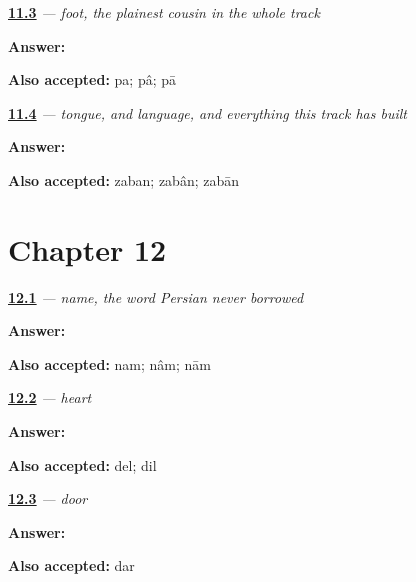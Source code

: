 \noindent\begin{minipage}[t]{\linewidth}
\raggedright
\hyperlink{review-FA-C11-pa-meaning}{\textbf{11.3}} \emph{ — foot, the plainest cousin in the whole track}\par
\small \textbf{Answer:} \par
\footnotesize \textbf{Also accepted:} pa; pâ; pā
\end{minipage}\par\medskip

\noindent\begin{minipage}[t]{\linewidth}
\raggedright
\hyperlink{review-FA-C11-zaban-meaning}{\textbf{11.4}} \emph{ — tongue, and language, and everything this track has built}\par
\small \textbf{Answer:} \par
\footnotesize \textbf{Also accepted:} zaban; zabân; zabān
\end{minipage}\par\medskip

\section*{Chapter 12}

\noindent\begin{minipage}[t]{\linewidth}
\raggedright
\hyperlink{review-FA-C12-nam-meaning}{\textbf{12.1}} \emph{ — name, the word Persian never borrowed}\par
\small \textbf{Answer:} \par
\footnotesize \textbf{Also accepted:} nam; nâm; nām
\end{minipage}\par\medskip

\noindent\begin{minipage}[t]{\linewidth}
\raggedright
\hyperlink{review-FA-C12-del-meaning}{\textbf{12.2}} \emph{ — heart}\par
\small \textbf{Answer:} \par
\footnotesize \textbf{Also accepted:} del; dil
\end{minipage}\par\medskip

\noindent\begin{minipage}[t]{\linewidth}
\raggedright
\hyperlink{review-FA-C12-dar-meaning}{\textbf{12.3}} \emph{ — door}\par
\small \textbf{Answer:} \par
\footnotesize \textbf{Also accepted:} dar
\end{minipage}\par\medskip

